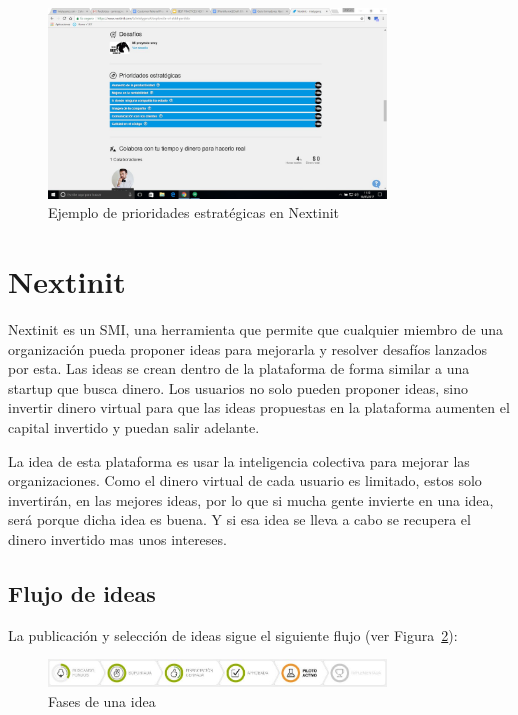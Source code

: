 \begin{figure}[!h]
	\begin{center}
		\includegraphics[width=0.8\textwidth]{./img/introduccion/prioridades.png}
		\caption{Ejemplo de prioridades estratégicas en Nextinit}
		\label{fig:prioridades}
	\end{center}
\end{figure}
 
 
 \section{Nextinit}
 
 Nextinit es un \acs{SMI}, una herramienta que permite que cualquier miembro de una organización pueda
 proponer ideas para  mejorarla y resolver desafíos lanzados por esta. Las ideas se crean dentro de la 
 plataforma de forma similar a una startup que busca dinero. Los usuarios no solo pueden  proponer ideas, sino 
 invertir dinero virtual para que las ideas propuestas en la plataforma aumenten el capital invertido   y 
 puedan salir adelante.
 
 La idea de esta plataforma es usar la inteligencia colectiva para mejorar las organizaciones. Como el dinero 
 virtual de cada usuario es limitado, estos solo invertirán,  en las mejores ideas, por lo que si mucha gente 
 invierte en una idea, será porque dicha idea es buena. Y si esa idea se lleva a cabo se recupera el dinero 
 invertido  mas unos intereses.
  
 \subsection{Flujo de ideas}
 
 La publicación y selección de ideas sigue el siguiente flujo (ver Figura~\ref{fig:flujo}):
 
 \begin{figure}[!h]
 \begin{center}
 \includegraphics[width=0.8\textwidth]{./img/introduccion/flujo.png}
 \caption{Fases de una idea}
 \label{fig:flujo}
 \end{center}
 \end{figure}
 
